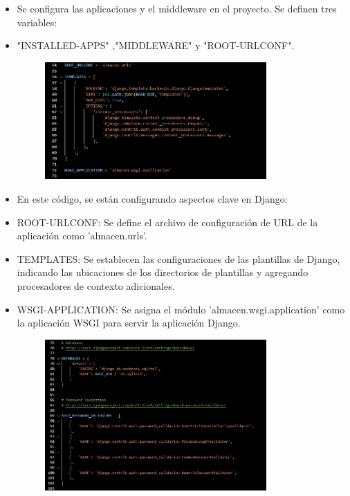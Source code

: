 \documentclass{article}
\begin{document}
 \begin{itemize}
 \item Se configura las aplicaciones y el middleware en el proyecto. Se definen tres variables:
 \item "INSTALLED-APPS" ,"MIDDLEWARE" y "ROOT-URLCONF".
	\begin{figure}[H]
		\centering
		\includegraphics[width=0.8\textwidth,keepaspectratio]{Latex/img/settings3.png}
	\end{figure}
	\end{itemize}

\begin{itemize}
 \item En este código, se están configurando aspectos clave en Django:
  \item ROOT-URLCONF: Se define el archivo de configuración de URL de la aplicación como 'almacen.urls'.
  \item TEMPLATES: Se establecen las configuraciones de las plantillas de Django, indicando las ubicaciones de los directorios de plantillas y agregando procesadores de contexto adicionales.
  \item WSGI-APPLICATION: Se asigna el módulo 'almacen.wsgi.application' como la aplicación WSGI para servir la aplicación Django.
	\begin{figure}[H]
		\centering
		\includegraphics[width=0.8\textwidth,keepaspectratio]{Latex/img/settings4.png}
	\end{figure}
	\end{itemize}
\end{document}
